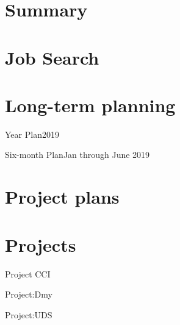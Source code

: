 \documentclass[]{beamer}
\begin{document}
\section{Summary}


\section{Job Search}


\section{Long-term planning}


%

\begin{frame}{Year Plan}{2019}
\end{frame}


\begin{frame}{Six-month Plan}{Jan through June 2019}
\end{frame}


\section{Project plans}
\relax



\section{Projects}

\begin{frame}{Project CCI}
\end{frame}
\begin{markdown}
\begin{frame}{Project:Dmy}
\end{frame}
\end{markdown}
\begin{frame}{Project:UDS}
\end{frame}
\end{document}

